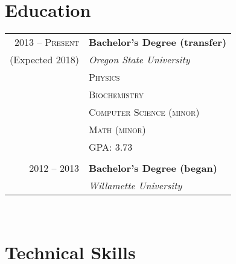 \documentclass[10pt]{article} %
\begin{document}
{\begin{minipage}[t]{0.44\textwidth}
\section{Education} 

\begin{tabular}{rl} %


2013 -- \textsc{Present} & \textbf{Bachelor's Degree (transfer)} \\
(Expected 2018)& \textit{Oregon State University}\\
& \textsc{Physics}\\
& \textsc{Biochemistry}\\
& \textsc{Computer Science (minor)}\\
& \textsc{Math (minor)}\\
& GPA: 3.73\\ \\
2012 -- 2013 & \textbf{Bachelor's Degree (began)} \\ 
& \textit{Willamette University}\\
	

\end{tabular}\\[10pt]


\section{Technical Skills} 


\end{minipage}}
\end{document}
